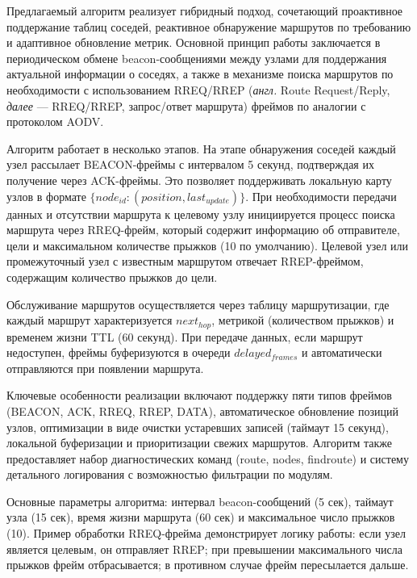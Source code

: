 Предлагаемый алгоритм реализует гибридный подход, сочетающий проактивное поддержание таблиц соседей, реактивное обнаружение маршрутов по требованию и 
адаптивное обновление метрик. Основной принцип работы заключается в периодическом обмене beacon-сообщениями между узлами для поддержания актуальной 
информации о соседях, а также в механизме поиска маршрутов по необходимости с использованием RREQ/RREP (\textit{англ.} Route Request/Reply, 
\textit{далее} — RREQ/RREP, запрос/ответ маршрута) фреймов по аналогии с протоколом AODV.

Алгоритм работает в несколько этапов. На этапе обнаружения соседей каждый узел рассылает BEACON-фреймы с интервалом 5 секунд, подтверждая их получение 
через ACK-фреймы. Это позволяет поддерживать локальную карту узлов в формате $\{node_{id}: (position, last_{update})\}$. При необходимости передачи данных и 
отсутствии маршрута к целевому узлу инициируется процесс поиска маршрута через RREQ-фрейм, который содержит информацию об отправителе, цели и максимальном 
количестве прыжков (10 по умолчанию). Целевой узел или промежуточный узел с известным маршрутом отвечает RREP-фреймом, содержащим количество прыжков до цели.

Обслуживание маршрутов осуществляется через таблицу маршрутизации, где каждый маршрут характеризуется $next_{hop}$, метрикой (количеством прыжков) и временем 
жизни TTL (60 секунд). При передаче данных, если маршрут недоступен, фреймы буферизуются в очереди $delayed_{frames}$ и автоматически отправляются при появлении 
маршрута.

Ключевые особенности реализации включают поддержку пяти типов фреймов (BEACON, ACK, RREQ, RREP, DATA), автоматическое обновление позиций узлов, оптимизации 
в виде очистки устаревших записей (таймаут 15 секунд), локальной буферизации и приоритизации свежих маршрутов. Алгоритм также предоставляет набор 
диагностических команд (route, nodes, findroute) и систему детального логирования с возможностью фильтрации по модулям.

Основные параметры алгоритма: интервал beacon-сообщений (5 сек), таймаут узла (15 сек), время жизни маршрута (60 сек) и максимальное число прыжков (10). 
Пример обработки RREQ-фрейма демонстрирует логику работы: если узел является целевым, он отправляет RREP; при превышении максимального числа прыжков фрейм 
отбрасывается; в противном случае фрейм пересылается дальше.

